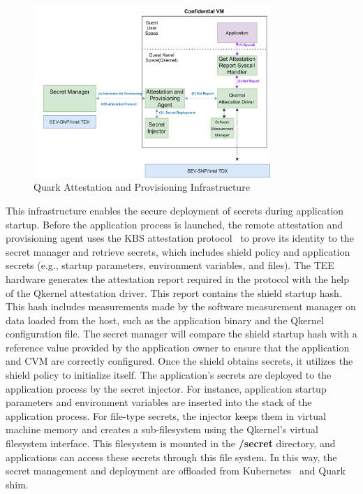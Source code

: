 \begin{figure}[!htb]
    \centering
    \includegraphics[width=0.8\textwidth]{images/Qkernel_attestation_infrastructurc.png}
    \caption[Quark Attestation and Provisioning Infrastructure]{Quark Attestation and Provisioning Infrastructure}
    \label{fig:Qkernel_attestation_infrastructurc}
\end{figure}
This infrastructure enables the secure deployment of secrets during application startup. Before the application process is launched, the remote attestation and provisioning agent uses the KBS attestation protocol~\cite*{kbs_Attestation_protocol} to prove its identity to the secret manager and retrieve secrets, which includes shield policy and application 
secrets (e.g., startup parameters, environment variables, and files). The TEE hardware generates the attestation report required in the protocol with the help of the Qkernel attestation driver. This report contains the shield startup hash. This hash includes measurements made by the software measurement manager on data loaded from the host, such as 
the application binary and the Qkernel configuration file. The secret manager will compare the shield startup hash with a reference value provided by the application owner to ensure that the application and CVM are correctly configured. Once the shield obtains secrets, it utilizes the shield policy to initialize itself. The application’s secrets are 
deployed to the application process by the secret injector. For instance, application startup parameters and environment variables are inserted into the stack of the application process. For file-type secrets, the injector keeps them in virtual machine memory and creates a sub-filesystem using the Qkernel’s virtual filesystem interface. This filesystem is 
mounted in the \textbf{/secret} directory, and applications can access these secrets through this file system. In this way, the secret management and deployment are offloaded from Kubernetes~\cite*{k8s} and Quark shim.


